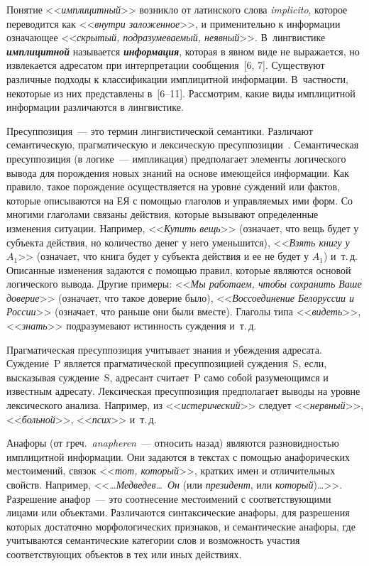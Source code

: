 \begin{multicols}{2}
     Понятие <<\textit{имплицитный}>> возникло от латинского слова 
\textit{implicito}, которое переводится как <<\textit{внут\-ри заложенное}>>, и 
применительно к информации означающее <<\textit{скрытый, 
подразумеваемый, неявный}>>. В~лингвистике {\bfseries\textit{имплицитной}} 
называется {\bfseries\textit{информация}}, которая в явном виде не выражается, 
но извлекается адресатом при интерпретации сообщения~[6, 7]. Существуют 
различные подходы к классификации имплицитной информации. 
     В~част\-ности, некоторые из них представлены в~[6--11]. Рассмотрим, 
какие виды имплицитной информации различаются в лингвистике.
     
     Пресуппозиция~--- это термин лингвистической семантики. Различают 
семантическую, прагматическую и лексическую 
     пресуппозиции~\cite{7kuz, 9kuz}. Семантическая пресуппозиция (в 
логике~--- импликация) предполагает элементы логического вывода для 
порождения новых знаний на основе имеющейся информации. Как правило, 
такое порождение осуществляется на уровне суждений или фактов, которые 
описываются на ЕЯ с помощью глаголов и управляемых ими форм. Со многими 
глаголами связаны действия, которые вызывают определенные изменения 
ситуации. Например, <<\textit{Купить вещь}>> (означает, что вещь будет у 
субъекта действия, но количество денег у него уменьшится), <<\textit{Взять 
книгу у}~$A_1$>> (означает, что книга будет у субъекта действия и ее не будет 
у $A_1$) и~т.\,д. Описанные изменения задаются с помощью правил, которые 
являются основой логического вывода. Другие примеры: <<\textit{Мы 
работаем, чтобы сохранить Ваше доверие}>> (означает, что такое доверие 
было), <<\textit{Воссоединение Белоруссии и России}>> (означает, что раньше 
они были вместе). Глаголы типа <<\textit{видеть}>>, <<\textit{знать}>> 
подразумевают истинность суждения и~т.\,д. 
     
     Прагматическая пресуппозиция учитывает знания и убеждения адресата. 
Суждение~P является прагматической пресуппозицией суждения~S, если, 
высказывая суждение~S, адресант считает~P само собой разумеющимся и 
известным адресату. Лексическая пресуппозиция предполагает выводы на 
уровне лексического анализа. Например, из <<\textit{истерический}>> следует 
<<\textit{нервный}>>, <<\textit{больной}>>, <<\textit{псих}>> и~т.\,д. 
     
     Анафоры (от греч.\ \textit{anapheren}~--- относить назад) являются 
разновидностью имплицитной информации. Они задаются в текстах с помощью 
анафорических местоимений, связок <<\textit{тот, который}>>, кратких имен 
и отличительных свойств. Например, <<\ldots\textit{Медведев}\ldots\ \textit{Он} 
(или \textit{президент}, или \textit{который})\ldots>>. Разрешение анафор~--- 
это соотнесение местоимений с соответствующими лицами или объектами. 
Различаются синтаксические анафоры, для разрешения которых достаточно 
морфологических признаков, и семантические анафоры, где учитываются 
семантические категории слов и возможность участия соответствующих 
объектов в тех или иных действиях.
     

\end{multicols}
